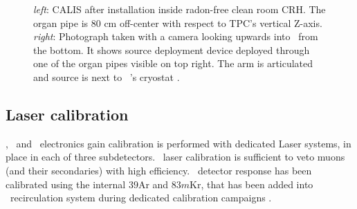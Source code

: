 \begin{figure}[htbp]
 \centering
{}
\caption{\textit{left}: CALIS after installation inside radon-free clean room CRH. The organ pipe is 80 cm off-center with respect to TPC's vertical Z-axis. \textit{right}: Photograph taken with a camera looking upwards into \lsv\ from the bottom. It shows source deployment device deployed through one of the organ pipes visible on top right. The arm is articulated and source is next to \lar\ \tpc's cryostat \cite{Agnes:2015qyz}.
\label{fig:CALIS_photos}}
\end{figure}

\subsection*{Laser calibration}
\wcv, \lsv\ and \tpc\ electronics gain calibration is performed with dedicated Laser systems, in place in each of three subdetectors. \wcv\ laser calibration is sufficient to veto muons (and their secondaries) with high efficiency. \tpc\ detector response has been calibrated using the internal ${39}$Ar and $83m$Kr, that has been added into \lar\ recirculation system during dedicated calibration campaigns \cite{Agnes:2015gu}.







